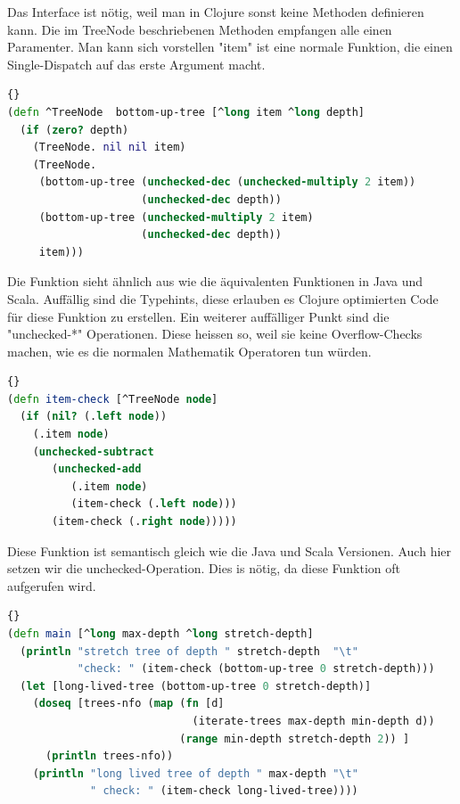 \documentclass{fancydocument}
\begin{document}
Das Interface ist n\"otig, weil man in Clojure sonst keine Methoden
definieren kann. Die im TreeNode beschriebenen Methoden empfangen alle
einen Paramenter. Man kann sich vorstellen "item" ist eine normale
Funktion, die einen Single-Dispatch auf das erste Argument macht.
\\
\begin{lstlisting}[language=Clojure,caption=Clojure Tree Function]{}
(defn ^TreeNode  bottom-up-tree [^long item ^long depth]
  (if (zero? depth)
    (TreeNode. nil nil item)
    (TreeNode.
     (bottom-up-tree (unchecked-dec (unchecked-multiply 2 item))
                     (unchecked-dec depth))
     (bottom-up-tree (unchecked-multiply 2 item)
                     (unchecked-dec depth))
     item)))
\end{lstlisting}

Die Funktion sieht \"ahnlich aus wie die äquivalenten Funktionen in Java
und Scala. Auffällig sind die Typehints, diese erlauben es Clojure
optimierten Code f\"ur diese Funktion zu erstellen. Ein weiterer
auffälliger Punkt sind die "unchecked-*" Operationen. Diese heissen
so, weil sie keine Overflow-Checks machen, wie es die normalen
Mathematik Operatoren tun w\"urden.
\\
\begin{lstlisting}[language=Clojure,caption=Clojure item-check]{}
(defn item-check [^TreeNode node]
  (if (nil? (.left node))
    (.item node)
    (unchecked-subtract
       (unchecked-add 
          (.item node)
          (item-check (.left node)))
       (item-check (.right node)))))
\end{lstlisting}

Diese Funktion ist semantisch gleich wie die Java und Scala
Versionen. Auch hier setzen wir die unchecked-Operation. Dies is n\"otig,
da diese Funktion oft aufgerufen wird.
\\
\begin{lstlisting}[language=Clojure,caption=Clojure Main]{}
(defn main [^long max-depth ^long stretch-depth]
  (println "stretch tree of depth " stretch-depth  "\t"
           "check: " (item-check (bottom-up-tree 0 stretch-depth)))
  (let [long-lived-tree (bottom-up-tree 0 stretch-depth)]
    (doseq [trees-nfo (map (fn [d]
                             (iterate-trees max-depth min-depth d))
                           (range min-depth stretch-depth 2)) ]
      (println trees-nfo))
    (println "long lived tree of depth " max-depth "\t"
             " check: " (item-check long-lived-tree))))
\end{lstlisting}
\end{document}
